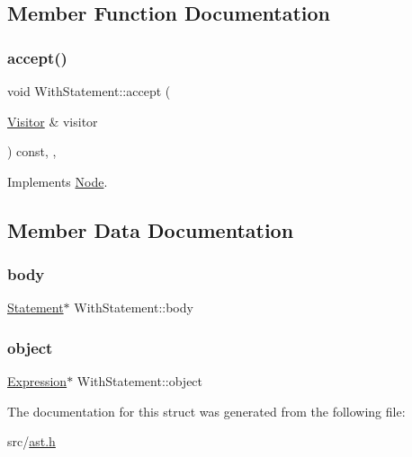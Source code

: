 \subsection{Member Function Documentation}
\mbox{\label{struct_with_statement_a07d3015de8ea5d3f27a0bab8719665f3}} 
\subsubsection{\texorpdfstring{accept()}{accept()}}
{\footnotesize\ttfamily void With\+Statement\+::accept (\begin{DoxyParamCaption}\item[{\hyperlink{struct_visitor}{Visitor} \&}]{visitor }\end{DoxyParamCaption}) const\hspace{0.3cm}{\ttfamily [inline]}, {\ttfamily [override]}, {\ttfamily [virtual]}}



Implements \hyperlink{struct_node_a10bd7af968140bbf5fa461298a969c71}{Node}.



\subsection{Member Data Documentation}
\mbox{\label{struct_with_statement_af7976ff82c99c995f603c2d32e8122ff}} 
\subsubsection{\texorpdfstring{body}{body}}
{\footnotesize\ttfamily \hyperlink{struct_statement}{Statement}$\ast$ With\+Statement\+::body}

\mbox{\label{struct_with_statement_a1563aab5799cbe5112e7a0429f4956bd}} 
\subsubsection{\texorpdfstring{object}{object}}
{\footnotesize\ttfamily \hyperlink{struct_expression}{Expression}$\ast$ With\+Statement\+::object}



The documentation for this struct was generated from the following file\+:\begin{DoxyCompactItemize}
\item 
src/\hyperlink{ast_8h}{ast.\+h}\end{DoxyCompactItemize}

